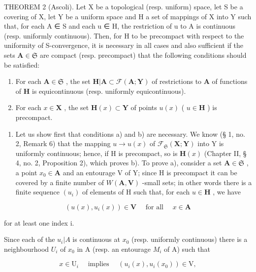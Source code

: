 THEOREM 2 (Ascoli). Let X be a topological (resp. uniform) space, let S be a covering of X, let Y be a uniform space and H a set of mappings of X into Y such that, for each A ∈ S and each u ∈ H, the restriction of u to A is continuous (resp. uniformly continuous). Then, for H to be precompact with respect to the uniformity of S-convergence, it is necessary in all cases and also sufficient if the sets \(\mathbf{A} \in \mathfrak{S}\) are compact (resp. precompact) that the following conditions should be satisfied:

\begin{enumerate}
\def\labelenumi{\alph{enumi})}
\item
  For each \(\mathbf{A} \in \mathfrak{S}\) , the set \(\mathbf{H}|\mathbf{A} \subset \mathcal{F}(\mathbf{A};\mathbf{Y})\) of restrictions to \(\mathbf{A}\) of functions of \(\mathbf{H}\) is equicontinuous (resp. uniformly equicontinuous).
\item
  For each \(x \in \mathbf{X}\) , the set \(\mathbf{H}(x) \subset \mathbf{Y}\) of points \(u(x)\) ( \(u \in \mathbf{H}\) ) is precompact.
\end{enumerate}

\begin{enumerate}
\def\labelenumi{\arabic{enumi})}
\tightlist
\item
  Let us show first that conditions a) and b) are necessary. We know (§ 1, no. 2, Remark 6) that the mapping \(u \to u(x)\) of \(\mathcal{F}_{\mathfrak{S}}(\mathbf{X};\mathbf{Y})\) into Y is uniformly continuous; hence, if H is precompact, so is \(\mathbf{H}(x)\) (Chapter II, § 4, no. 2, Proposition 2), which proves b). To prove a), consider a set \(\mathbf{A} \in \mathfrak{S}\) , a point \(x_0 \in \mathbf{A}\) and an entourage V of Y; since H is precompact it can be covered by a finite number of \(W(\mathbf{A},\mathbf{V})\) -small sets; in other words there is a finite sequence \((u_i)\) of elements of H such that, for each \(u \in \mathbf{H}\) , we have
\end{enumerate}

\[
(u (x), u _ {i} (x)) \in \mathbf {V} \quad \text { for   all } \quad x \in \mathbf {A}\tag{4}
\]

for at least one index i.

Since each of the \(u_{i}|A\) is continuous at \(x_{0}\) (resp. uniformly continuous) there is a neighbourhood \(U_{i}\) of \(x_{0}\) in A (resp. an entourage \(M_{i}\) of A) such that

\[
x \in \mathrm{U} _ {i} \quad \text { implies } \quad (u _ {i} (x), u _ {i} (x _ {0})) \in \mathrm{V},\tag{5}
\]

